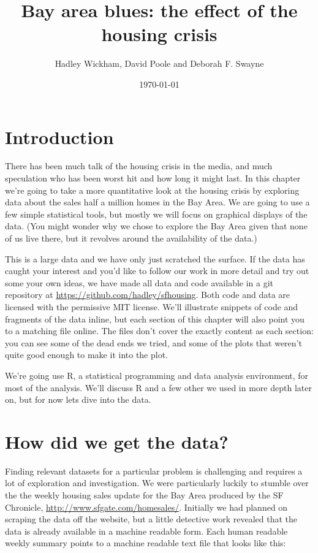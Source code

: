 \documentclass[oneside]{article}
\title{Bay area blues: the effect of the housing crisis}
\author{Hadley Wickham, David Poole and Deborah F. Swayne}
\date{\today}
\begin{document}
\maketitle 

\section{Introduction}

There has been much talk of the housing crisis in the media, and much speculation who has been worst hit and how long it might last.  In this chapter we're going to take a more quantitative look at the housing crisis by exploring data about the sales half a million homes in the Bay Area.  We are going to use a few simple statistical tools, but mostly we will focus on graphical displays of the data.  (You might wonder why we chose to explore the Bay Area given that none of us live there, but it revolves around the availability of the data.)

This is a large data and we have only just scratched the surface.  If the data has caught your interest and you'd like to follow our work in more detail and try out some your own ideas, we have made all data and code available in a git repository at \url{https://github.com/hadley/sfhousing}. Both code and data are licensed with the permissive MIT license.  We'll illustrate snippets of code and fragments of the data inline, but each section of this chapter will also point you to a matching file online.  The files don't cover the exactly content as each section: you can see some of the dead ends we tried, and some of the plots that weren't quite good enough to make it into the plot.  

We're going use R, a statistical programming and data analysis environment, for most of the analysis.  We'll discuss R and a few other we used in more depth later on, but for now lets dive into the data.

\section{How did we get the data?}

Finding relevant datasets for a particular problem is challenging and requires a lot of exploration and investigation.  We were particularly luckily to stumble over the the weekly housing sales update for the Bay Area produced by the SF Chronicle, \url{http://www.sfgate.com/homesales/}.  Initially we had planned on scraping the data off the website, but a little detective work revealed that the data is already available in a machine readable form.  Each human readable weekly summary points to a machine readable text file that looks like this: 
\end{document}
